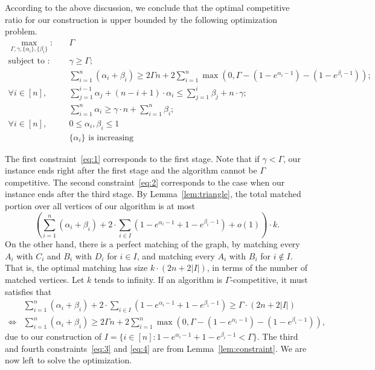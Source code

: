 According to the above discussion, we conclude that the optimal competitive ratio for our construction is upper bounded by the following optimization problem.
\begin{align}
\label{program:p1}
\max_{\Gamma,\gamma,\{\alpha_i\},\{\beta_i\}}: \quad  & \Gamma \tag{P1}\\
\label{eq:1}
\mbox{subject to :} \quad & \gamma \ge \Gamma; \\
\label{eq:2}
& \sum_{i=1}^{n} (\alpha_i + \beta_i) \ge 2 \Gamma n + 2 \sum_{i=1}^{n} \max(0,\Gamma - (1-e^{\alpha_i-1}) - (1-e^{\beta_i-1})); \\
\label{eq:3}
\forall i \in [n], \quad & \sum_{j=1}^{i-1} \alpha_j + (n-i+1) \cdot \alpha_i \le \sum_{j=1}^{i} \beta_j + n \cdot \gamma; \\
\label{eq:4}
	& \sum_{i=1}^{n} \alpha_i \ge \gamma \cdot n + \sum_{i=1}^{n} \beta_i; \\
\forall i \in [n], \quad & 0 \le \alpha_i, \beta_i \le 1 \\
& \{\alpha_i\} \text{ is increasing}
\end{align}



The first constraint~\eqref{eq:1} corresponds to the first stage. Note that if $\gamma < \Gamma$, our instance ends right after the first stage and the algorithm cannot be $\Gamma$ competitive. The second constraint~\eqref{eq:2} corresponds to the case when our instance ends after the third stage.
By Lemma~\ref{lem:triangle}, the total matched portion over all vertices of our algorithm is at most
\[
\left( \sum_{i=1}^{n} (\alpha_i + \beta_i) + 2 \cdot \sum_{i \in I} (1-e^{\alpha_i-1} + 1-e^{\beta_i-1}) + o(1) \right) \cdot k.
\]
On the other hand, there is a perfect matching of the graph, by matching every $A_i$ with $C_i$ and $B_i$ with $D_i$ for $i \in I$, and matching every $A_i$ with $B_i$ for $i \notin I$. That is, the optimal matching has size $k \cdot (2n + 2|I|)$, in terms of the number of matched vertices. Let $k$ tends to infinity. If an algorithm is $\Gamma$-competitive, it must satisfies that
\begin{align*}
& \sum_{i=1}^{n} (\alpha_i + \beta_i) + 2 \cdot \sum_{i \in I} (1-e^{\alpha_i-1} + 1-e^{\beta_i-1})  \ge \Gamma \cdot (2n + 2|I|) \\
 \iff & \sum_{i=1}^{n} (\alpha_i + \beta_i) \ge 2 \Gamma n + 2 \sum_{i=1}^{n} \max(0,\Gamma - (1-e^{\alpha_i-1}) - (1-e^{\beta_i-1})),
\end{align*}
due to our construction of $I = \{i \in [n]: 1-e^{\alpha_i-1} + 1-e^{\beta_i-1} < \Gamma\}$.
The third and fourth constraints~\eqref{eq:3} and \eqref{eq:4} are from Lemma~\ref{lem:constraint}. We are now left to solve the optimization. 

